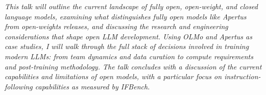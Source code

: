 \textit{This talk will outline the current landscape of fully open, open-weight, and closed language models, examining what distinguishes fully open models like Apertus from open-weights releases, and discussing the research and engineering considerations that shape open LLM development. Using OLMo and Apertus as case studies, I will walk through the full stack of decisions involved in training modern LLMs: from team dynamics and data curation to compute requirements and post-training methodology. The talk concludes with a discussion of the current capabilities and limitations of open models, with a particular focus on instruction-following capabilities as measured by IFBench.}
